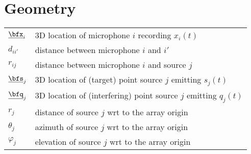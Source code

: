 
\section*{Geometry}
\begin{table}[H]
    \begin{tabular}{ll}
        $\underline{\bfx}_i$     & 3D location of microphone $i$ recording $x_i(t)$\\
        $d_{ii'}$   & distance between microphone $i$ and $i'$ \\
        $r_{ij}$   & distance between microphone $i$ and source $j$ \\
        $\underline{\bfs}_j$     & 3D location of (target) point source $j$ emitting $s_j(t)$\\
        $\underline{\bfq}_j$     & 3D location of (interfering) point source $j$ emitting $q_j(t)$\\
        $r_{j}$    & distance of source $j$ wrt to the array origin \\
        $\theta_{j}$    & azimuth of source $j$ wrt to the array origin\\
        $\varphi_{j}$    & elevation of source $j$ wrt to the array origin \\
    \end{tabular}
\end{table}

